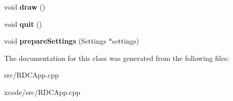 \begin{DoxyCompactItemize}
\item 
\hypertarget{class_r_d_c_app_ae9e4cc30d7dd25d5fc65d712e64d722f}{void {\bfseries draw} ()}\label{class_r_d_c_app_ae9e4cc30d7dd25d5fc65d712e64d722f}

\item 
\hypertarget{class_r_d_c_app_ab24352d72c0e773c6edd629584270c8e}{void {\bfseries quit} ()}\label{class_r_d_c_app_ab24352d72c0e773c6edd629584270c8e}

\item 
\hypertarget{class_r_d_c_app_a03237f9900e117ee9cf6fade74b3ada1}{void {\bfseries prepare\-Settings} (Settings $\ast$settings)}\label{class_r_d_c_app_a03237f9900e117ee9cf6fade74b3ada1}

\end{DoxyCompactItemize}


The documentation for this class was generated from the following files\-:\begin{DoxyCompactItemize}
\item 
src/R\-D\-C\-App.\-cpp\item 
xcode/src/R\-D\-C\-App.\-cpp\end{DoxyCompactItemize}
